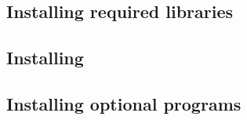 \subsection{Installing required libraries} 
\label{install:required}

\subsection{Installing \progname} 
\label{install:program}

\subsection{Installing optional programs} 
\label{install:optional}